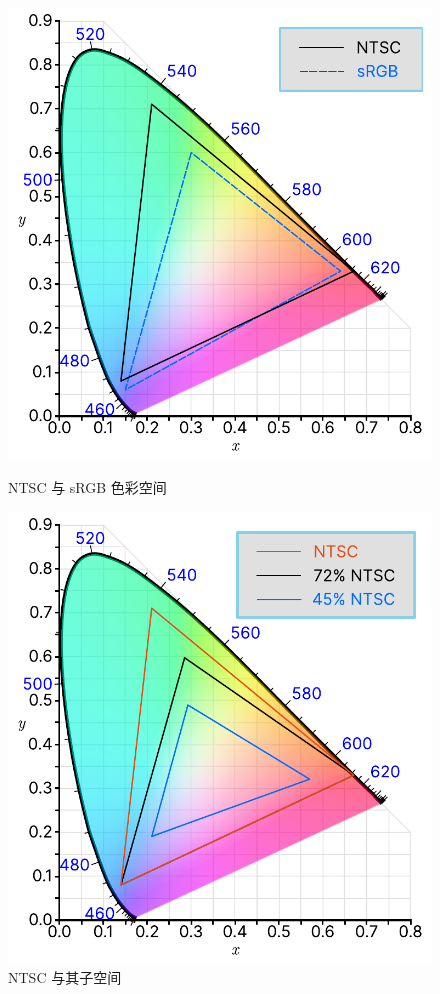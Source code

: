 \begin{figure}[tb!]
  \begin{minipage}{.49\textwidth}
    \centering
    \includegraphics[width=.8\textwidth]{assets/advanced/NTSC_sRGB.pdf}
    \caption{NTSC 与 sRGB 色彩空间}
    \label{fig:NTSC_sRGB}
  \end{minipage}
  \qquad
  \begin{minipage}{.49\textwidth}
  \centering
  \includegraphics[width=.8\textwidth]{assets/advanced/NTSC_72_45.pdf}
  \caption{NTSC 与其子空间}
  \label{fig:NTSC_72_45}
  \end{minipage}
\end{figure}

